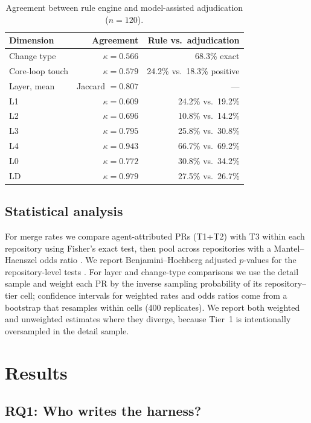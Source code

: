 \documentclass[sigconf,review]{acmart}
\begin{document}
\begin{table}[t]
\centering
\small
\caption{Agreement between rule engine and model-assisted adjudication ($n=120$).}
\label{tab:agreement}
\begin{tabular}{@{}lrr@{}}
\toprule
Dimension & Agreement & Rule vs.\ adjudication \\
\midrule
Change type & $\kappa=0.566$ & 68.3\% exact \\
Core-loop touch & $\kappa=0.579$ & 24.2\% vs.\ 18.3\% positive \\
Layer, mean & Jaccard $=0.807$ & --- \\
\quad L1 & $\kappa=0.609$ & 24.2\% vs.\ 19.2\% \\
\quad L2 & $\kappa=0.696$ & 10.8\% vs.\ 14.2\% \\
\quad L3 & $\kappa=0.795$ & 25.8\% vs.\ 30.8\% \\
\quad L4 & $\kappa=0.943$ & 66.7\% vs.\ 69.2\% \\
\quad L0 & $\kappa=0.772$ & 30.8\% vs.\ 34.2\% \\
\quad LD & $\kappa=0.979$ & 27.5\% vs.\ 26.7\% \\
\bottomrule
\end{tabular}
\end{table}

\subsection{Statistical analysis}

For merge rates we compare agent-attributed PRs (T1+T2) with T3 within each repository using Fisher's exact test, then pool across repositories with a Mantel--Haenszel odds ratio \citep{mantel1959}. We report Benjamini--Hochberg adjusted $p$-values for the repository-level tests \citep{bh1995}. For layer and change-type comparisons we use the detail sample and weight each PR by the inverse sampling probability of its repository--tier cell; confidence intervals for weighted rates and odds ratios come from a bootstrap that resamples within cells (400 replicates). We report both weighted and unweighted estimates where they diverge, because Tier~1 is intentionally oversampled in the detail sample.

\section{Results}
\label{sec:results}

\subsection{RQ1: Who writes the harness?}
\end{document}
